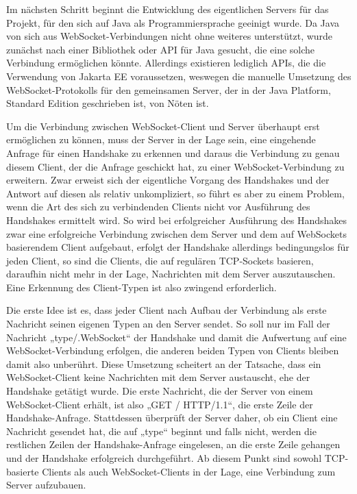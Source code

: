 \documentclass[12pt, onecolumn, notitlepage]{scrartcl}
\begin{document}
Im nächsten Schritt beginnt die Entwicklung des eigentlichen Servers für das Projekt, für den sich auf Java als Programmiersprache geeinigt wurde. Da Java von sich aus WebSocket-Verbindungen nicht ohne weiteres unterstützt, wurde zunächst nach einer Bibliothek oder API für Java gesucht, die eine solche Verbindung ermöglichen könnte. Allerdings existieren lediglich APIs, die die Verwendung von Jakarta EE voraussetzen, weswegen die manuelle Umsetzung des WebSocket-Protokolls für den gemeinsamen Server, der in der Java Platform, Standard Edition geschrieben ist, von Nöten ist. \par

Um die Verbindung zwischen WebSocket-Client und Server überhaupt erst ermöglichen zu können, muss der Server in der Lage sein, eine eingehende Anfrage für einen Handshake zu erkennen und daraus die Verbindung zu genau diesem Client, der die Anfrage geschickt hat, zu einer WebSocket-Verbindung zu erweitern. Zwar erweist sich der eigentliche Vorgang des Handshakes und der Antwort auf diesen als relativ unkompliziert, so führt es aber zu einem Problem, wenn die Art des sich zu verbindenden Clients nicht vor Ausführung des Handshakes ermittelt wird. So wird bei erfolgreicher Ausführung des Handshakes zwar eine erfolgreiche Verbindung zwischen dem Server und dem auf WebSockets basierendem Client aufgebaut, erfolgt der Handshake allerdings bedingungslos für jeden Client, so sind die Clients, die auf regulären TCP-Sockets basieren, daraufhin nicht mehr in der Lage, Nachrichten mit dem Server auszutauschen. Eine Erkennung des Client-Typen ist also zwingend erforderlich. \par

Die erste Idee ist es, dass jeder Client nach Aufbau der Verbindung als erste Nachricht seinen eigenen Typen an den Server sendet. So soll nur im Fall der Nachricht „type/.WebSocket“ der Handshake und damit die Aufwertung auf eine WebSocket-Verbindung erfolgen, die anderen beiden Typen von Clients bleiben damit also unberührt. Diese Umsetzung scheitert an der Tatsache, dass ein WebSocket-Client keine Nachrichten mit dem Server austauscht, ehe der Handshake getätigt wurde. Die erste Nachricht, die der Server von einem WebSocket-Client erhält, ist also „GET / HTTP/1.1“, die erste Zeile der Handshake-Anfrage. Stattdessen überprüft der Server daher, ob ein Client eine Nachricht gesendet hat, die auf „type“ beginnt und falls nicht, werden die restlichen Zeilen der Handshake-Anfrage eingelesen,  an die erste Zeile gehangen und der Handshake erfolgreich durchgeführt. Ab diesem Punkt sind sowohl TCP-basierte Clients als auch WebSocket-Clients in der Lage, eine Verbindung zum Server aufzubauen. \par
\end{document}
